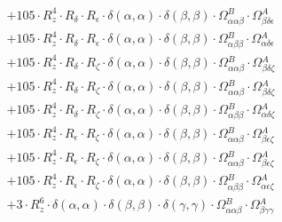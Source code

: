 \documentclass{article}
\begin{document}
\begin{subequations}
\begin{gather}
\begin{array}{c}
 \\[0.2em] 		 + 105 \cdot R_{z}^{4} \cdot R_{\delta{}} \cdot R_{\epsilon{}} \cdot \delta{}\left(\alpha{}, \alpha{}\right) \cdot \delta{}\left(\beta{}, \beta{}\right) \cdot \Omega{}^{B}_{\alpha{}\alpha{}\beta{}} \cdot \Omega{}^{A}_{\beta{}\delta{}\epsilon{}} 
 \\[0.2em] 		 + 105 \cdot R_{z}^{4} \cdot R_{\delta{}} \cdot R_{\epsilon{}} \cdot \delta{}\left(\alpha{}, \alpha{}\right) \cdot \delta{}\left(\beta{}, \beta{}\right) \cdot \Omega{}^{B}_{\alpha{}\beta{}\beta{}} \cdot \Omega{}^{A}_{\alpha{}\delta{}\epsilon{}} 
 \\[0.2em] 		 + 105 \cdot R_{z}^{4} \cdot R_{\delta{}} \cdot R_{\zeta{}} \cdot \delta{}\left(\alpha{}, \alpha{}\right) \cdot \delta{}\left(\beta{}, \beta{}\right) \cdot \Omega{}^{B}_{\alpha{}\alpha{}\beta{}} \cdot \Omega{}^{A}_{\beta{}\delta{}\zeta{}} 
 \\[0.2em] 		 + 105 \cdot R_{z}^{4} \cdot R_{\delta{}} \cdot R_{\zeta{}} \cdot \delta{}\left(\alpha{}, \alpha{}\right) \cdot \delta{}\left(\beta{}, \beta{}\right) \cdot \Omega{}^{B}_{\alpha{}\alpha{}\beta{}} \cdot \Omega{}^{A}_{\beta{}\delta{}\zeta{}} 
 \\[0.2em] 		 + 105 \cdot R_{z}^{4} \cdot R_{\delta{}} \cdot R_{\zeta{}} \cdot \delta{}\left(\alpha{}, \alpha{}\right) \cdot \delta{}\left(\beta{}, \beta{}\right) \cdot \Omega{}^{B}_{\alpha{}\beta{}\beta{}} \cdot \Omega{}^{A}_{\alpha{}\delta{}\zeta{}} 
 \\[0.2em] 		 + 105 \cdot R_{z}^{4} \cdot R_{\epsilon{}} \cdot R_{\zeta{}} \cdot \delta{}\left(\alpha{}, \alpha{}\right) \cdot \delta{}\left(\beta{}, \beta{}\right) \cdot \Omega{}^{B}_{\alpha{}\alpha{}\beta{}} \cdot \Omega{}^{A}_{\beta{}\epsilon{}\zeta{}} 
 \\[0.2em] 		 + 105 \cdot R_{z}^{4} \cdot R_{\epsilon{}} \cdot R_{\zeta{}} \cdot \delta{}\left(\alpha{}, \alpha{}\right) \cdot \delta{}\left(\beta{}, \beta{}\right) \cdot \Omega{}^{B}_{\alpha{}\alpha{}\beta{}} \cdot \Omega{}^{A}_{\beta{}\epsilon{}\zeta{}} 
 \\[0.2em] 		 + 105 \cdot R_{z}^{4} \cdot R_{\epsilon{}} \cdot R_{\zeta{}} \cdot \delta{}\left(\alpha{}, \alpha{}\right) \cdot \delta{}\left(\beta{}, \beta{}\right) \cdot \Omega{}^{B}_{\alpha{}\beta{}\beta{}} \cdot \Omega{}^{A}_{\alpha{}\epsilon{}\zeta{}} 
 \\[0.2em] 		 + 3 \cdot R_{z}^{6} \cdot \delta{}\left(\alpha{}, \alpha{}\right) \cdot \delta{}\left(\beta{}, \beta{}\right) \cdot \delta{}\left(\gamma{}, \gamma{}\right) \cdot \Omega{}^{B}_{\alpha{}\alpha{}\beta{}} \cdot \Omega{}^{A}_{\beta{}\gamma{}\gamma{}} 

\end{array}
\end{gather}
\end{subequations}
\end{document}
